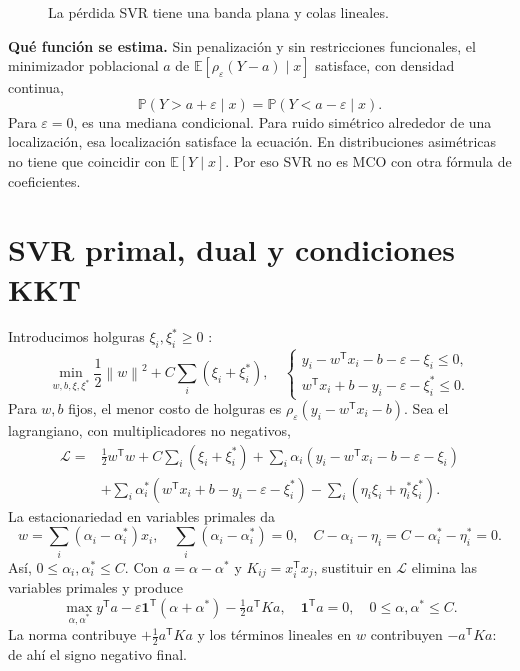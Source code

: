 \documentclass[11pt,a4paper]{article}
\newcommand{\E}{\mathbb E}
\newcommand{\Prob}{\mathbb P}
\newcommand{\T}{^{\mathsf T}}
\newcommand{\ones}{\mathbf 1}
\newcommand{\norm}[1]{\left\lVert #1\right\rVert}
\newcommand{\topic}[2]{\clearpage\section{#1}\label{#2}}
\theoremstyle{definition}\newtheorem{definicion}[teorema]{Definición}
\begin{document}
\begin{figure}[H]\centering
{}
\caption{La pérdida SVR tiene una banda plana y colas lineales.}
\end{figure}
\textbf{Qué función se estima.}
Sin penalización y sin restricciones funcionales, el minimizador poblacional
$a$ de $\E[\rho_\varepsilon(Y-a)\mid x]$ satisface, con densidad continua,
\[
\Prob(Y>a+\varepsilon\mid x)=\Prob(Y<a-\varepsilon\mid x).
\]
Para $\varepsilon=0$, es una mediana condicional.
Para ruido simétrico alrededor de una localización, esa localización
satisface la ecuación. En distribuciones asimétricas no tiene que coincidir
con $\E[Y\mid x]$. Por eso SVR no es MCO con otra fórmula de coeficientes.

\topic{SVR primal, dual y condiciones KKT}{s50}
Introducimos holguras $\xi_i,\xi_i^*\ge0$ \cite{smola}:
\[
\min_{w,b,\xi,\xi^*}\frac12\norm w^2+C\sum_i(\xi_i+\xi_i^*),
\quad
\begin{cases}
y_i-w\T x_i-b-\varepsilon-\xi_i\le0,\\
w\T x_i+b-y_i-\varepsilon-\xi_i^*\le0.
\end{cases}
\]
Para $w,b$ fijos, el menor costo de holguras es
$\rho_\varepsilon(y_i-w\T x_i-b)$.
Sea el lagrangiano, con multiplicadores no negativos,
\[
\begin{aligned}
\mathcal L={}&\tfrac12w\T w+C\sum_i(\xi_i+\xi_i^*)
+\sum_i\alpha_i(y_i-w\T x_i-b-\varepsilon-\xi_i)\\
&+\sum_i\alpha_i^*(w\T x_i+b-y_i-\varepsilon-\xi_i^*)
-\sum_i(\eta_i\xi_i+\eta_i^*\xi_i^*).
\end{aligned}
\]
La estacionariedad en variables primales da
\[
w=\sum_i(\alpha_i-\alpha_i^*)x_i,\quad
\sum_i(\alpha_i-\alpha_i^*)=0,\quad
C-\alpha_i-\eta_i=C-\alpha_i^*-\eta_i^*=0.
\]
Así, $0\le\alpha_i,\alpha_i^*\le C$.
Con $a=\alpha-\alpha^*$ y $K_{ij}=x_i\T x_j$, sustituir en
$\mathcal L$ elimina las variables primales y produce
\[
\boxed{\max_{\alpha,\alpha^*}
y\T a-\varepsilon\ones\T(\alpha+\alpha^*)
-\tfrac12a\T Ka},
\quad \ones\T a=0,\quad 0\le\alpha,\alpha^*\le C.
\]
La norma contribuye $+\tfrac12a\T Ka$ y los términos lineales en $w$
contribuyen $-a\T Ka$: de ahí el signo negativo final.
\end{document}
